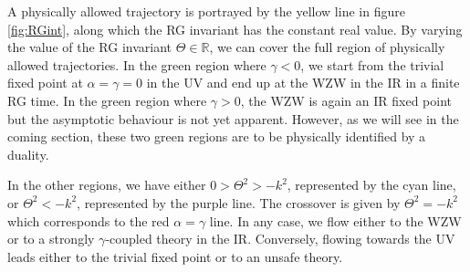 \documentclass[12pt]{article}
\begin{document}
\noindent A physically allowed trajectory is portrayed by the yellow line in figure \ref{fig:RGint}, along which the RG invariant has the constant real value. By varying the value of the RG invariant $\Theta \in \mathbb{R}$, we can cover the full region of physically allowed trajectories. In the green region where $\gamma<0$, we start from the trivial fixed point at $\alpha=\gamma=0$ in the UV and end up at the WZW in the IR in a finite RG time. In the green region where $\gamma>0$, the WZW is again an IR fixed point but the asymptotic behaviour is not yet apparent.  However, as we will see in the coming section, these two green regions are to be physically identified by a duality.  

 
\noindent  In the other regions, we have either $0>\Theta^{2} > -k^{2}$, represented by the cyan line, or $\Theta^{2}<-k^{2}$, represented by the purple line.  The crossover is given by $\Theta^{2}=-k^{2}$ which corresponds to the red $\alpha=\gamma$ line. In any case, we flow either to the WZW or to a {\color{black}strongly $\gamma$-coupled theory} in the IR. Conversely, flowing towards the UV leads either to the trivial fixed point or to an {\color{black}unsafe} theory.
\end{document}
